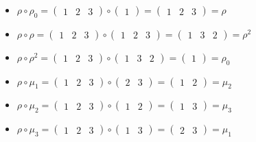 \documentclass{article}
\begin{document}
\begin{itemize}
        \item $\rho\circ\rho_0 =\begin{pmatrix}1&2&3\end{pmatrix}\circ\begin{pmatrix}1\end{pmatrix}=\begin{pmatrix}1&2&3\end{pmatrix}=\rho$
        \item $\rho\circ\rho =\begin{pmatrix}1&2&3\end{pmatrix}\circ\begin{pmatrix}1&2&3\end{pmatrix}=\begin{pmatrix}1&3&2\end{pmatrix}=\rho^2$
        \item $\rho\circ\rho^2 =\begin{pmatrix}1&2&3\end{pmatrix}\circ\begin{pmatrix}1&3&2\end{pmatrix}=\begin{pmatrix}1\end{pmatrix}=\rho_0$
        \item $\rho\circ\mu_1 =\begin{pmatrix}1&2&3\end{pmatrix}\circ\begin{pmatrix}2&3\end{pmatrix}=\begin{pmatrix}1&2\end{pmatrix}=\mu_2$
        \item $\rho\circ\mu_2 =\begin{pmatrix}1&2&3\end{pmatrix}\circ\begin{pmatrix}1&2\end{pmatrix}=\begin{pmatrix}1&3\end{pmatrix}=\mu_3$
        \item $\rho\circ\mu_3 =\begin{pmatrix}1&2&3\end{pmatrix}\circ\begin{pmatrix}1&3\end{pmatrix}=\begin{pmatrix}2&3\end{pmatrix}=\mu_1$


\end{itemize}
\end{document}
